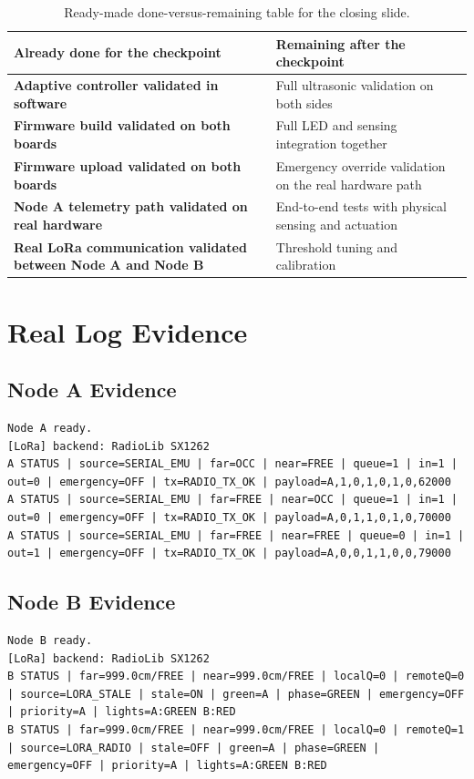 \documentclass[11pt,a4paper]{article}
\begin{document}
\begin{table}[h!]
\centering
\small
\begin{tabularx}{\textwidth}{>{\bfseries}Y Y}
\toprule
Already done for the checkpoint & Remaining after the checkpoint \\
\midrule
Adaptive controller validated in software & Full ultrasonic validation on both sides \\
Firmware build validated on both boards & Full LED and sensing integration together \\
Firmware upload validated on both boards & Emergency override validation on the real hardware path \\
Node A telemetry path validated on real hardware & End-to-end tests with physical sensing and actuation \\
Real LoRa communication validated between Node A and Node B & Threshold tuning and calibration \\
\bottomrule
\end{tabularx}
\caption{Ready-made done-versus-remaining table for the closing slide.}
\end{table}

\section{Real Log Evidence}

\subsection*{Node A Evidence}

\begin{lstlisting}
Node A ready.
[LoRa] backend: RadioLib SX1262
A STATUS | source=SERIAL_EMU | far=OCC | near=FREE | queue=1 | in=1 | out=0 | emergency=OFF | tx=RADIO_TX_OK | payload=A,1,0,1,0,1,0,62000
A STATUS | source=SERIAL_EMU | far=FREE | near=OCC | queue=1 | in=1 | out=0 | emergency=OFF | tx=RADIO_TX_OK | payload=A,0,1,1,0,1,0,70000
A STATUS | source=SERIAL_EMU | far=FREE | near=FREE | queue=0 | in=1 | out=1 | emergency=OFF | tx=RADIO_TX_OK | payload=A,0,0,1,1,0,0,79000
\end{lstlisting}

\subsection*{Node B Evidence}

\begin{lstlisting}
Node B ready.
[LoRa] backend: RadioLib SX1262
B STATUS | far=999.0cm/FREE | near=999.0cm/FREE | localQ=0 | remoteQ=0 | source=LORA_STALE | stale=ON | green=A | phase=GREEN | emergency=OFF | priority=A | lights=A:GREEN B:RED
B STATUS | far=999.0cm/FREE | near=999.0cm/FREE | localQ=0 | remoteQ=1 | source=LORA_RADIO | stale=OFF | green=A | phase=GREEN | emergency=OFF | priority=A | lights=A:GREEN B:RED
\end{lstlisting}
\end{document}
